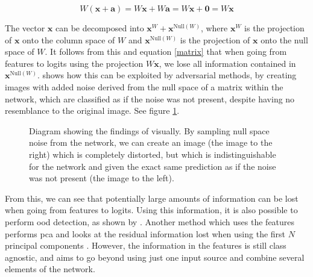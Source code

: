 \documentclass[UKenglish]{uiomasterthesis} %
\theoremstyle{definition}
\begin{document}
\begin{equation}
W (\bm{x} + \bm{a}) = W \bm{x} + W \bm{a} = W \bm{x} + \bm{0} = W \bm{x}
\label{matrix}
\end{equation}

The vector $\bm{x}$ can be decomposed into $\bm{x}^W + \bm{x}^{\text{Null}(W)}$, where $\bm{x}^W$ is the projection of $\bm{x}$ onto the column space of $W$ and $\bm{x}^{\text{Null}(W)}$ is the projection of $\bm{x}$ onto the null space of $W$. It follows from this and equation \ref{matrix} that when going from features to logits using the projection $W \bm{x}$, we lose all information contained in $\bm{x}^{\text{Null}(W)}$. \cite{nusa} shows how this can be exploited by adversarial methods, by creating images with added noise derived from the null space of a matrix within the network, which are classified as if the noise was not present, despite having no resemblance to the original image. See figure \ref{dog}.

\begin{figure}[H]
    \begin{center}

    \caption{Diagram showing the findings of \cite{nusa} visually. By sampling null space noise from the network, we can create an image (the image to the right) which is completely distorted, but which is indistinguishable for the network and given the exact same prediction as if the noise was not present (the image to the left).}
    \label{dog}
    \end{center}
\end{figure}


From this, we can see that potentially large amounts of information can be lost when going from features to logits. Using this information, it is also possible to perform \ac{ood} detection, as shown by \cite{nusa}. Another method which uses the features performs \ac{pca} and looks at the residual information lost when using the first $N$ principal components \cite{subspace}. However, the information in the features is still class agnostic, and \cite{vim} aims to go beyond using just one input source and combine several elements of the network.
\end{document}
